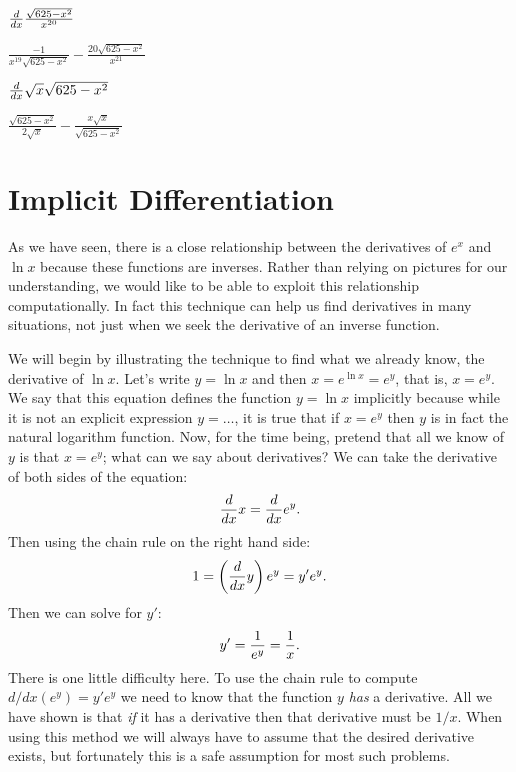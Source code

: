 \begin{exercise} $\frac{d}{dx}\frac{\sqrt{625-x^2}}{x^{20}}$
\begin{answer} $\frac{-1}{x^{19}\sqrt{625-x^2}}-\frac{20\sqrt{625-x^2}}{x^{21}}$
\end{answer}\end{exercise}



\begin{exercise} $\frac{d}{dx} \sqrt{x}\sqrt{625-x^2}$
\begin{answer} $\frac{\sqrt{625-x^2}}{2\sqrt{x}}-\frac{x\sqrt{x}}{\sqrt{625-x^2}}$
\end{answer}\end{exercise}












\section{Implicit Differentiation}



As we have seen, there is a close relationship between the derivatives
of $e^x$ and $\ln x$ because these functions are inverses. Rather
than relying on pictures for our understanding, we would like to be
able to exploit this relationship computationally.  In fact this
technique can help us find derivatives in many situations, not just
when we seek the derivative of an inverse function.

We will begin by illustrating the technique to find what we already
know, the derivative of $\ln x$. Let's write $y=\ln x$ and then $
x=e^{\ln x}=e^y$, that is, $x=e^y$. We say that this equation
defines the function $y=\ln x$ implicitly because while it is not an
explicit expression $y=\ldots$, it is true that if $x=e^y$ then
$y$ is in fact the natural logarithm function. Now, for the time
being, pretend that all we know of $y$ is that $x=e^y$; what can
we say about derivatives? We can take the derivative of both sides of
the equation:
$${d\over dx}x={d\over dx}e^y.$$
Then using the chain rule on the right hand side:
$$1 = \left({d\over dx}y\right) e^y = y'e^y.$$
Then we can solve for $y'$:
$$y'={1\over e^y} = {1\over x}.$$
There is one little difficulty here. To use the chain rule to compute 
$d/dx(e^y)=y'e^y$ we need to know that the function $y$ {\it has\/} a
derivative. All we have shown is that {\it if\/} it has a derivative
then that derivative must be $1/x$. When using this method we will
always have to assume that the desired derivative exists, but
fortunately this is a safe assumption for most such problems. 

